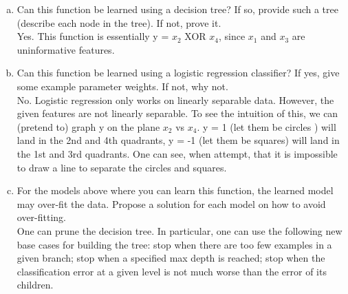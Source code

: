 \documentclass[11pt]{article}
\begin{document}
\begin{enumerate}[(a)]
\item Can this function be learned using a decision tree? If so, provide such a tree (describe each node in the tree). If not, prove it.\\

Yes. This function is essentially y = $x_2$ XOR $x_4$, since $x_1$ and $x_3$ are uninformative features.\\

\begin{center}
\end{center}

\item Can this function be learned using a logistic regression classifier? If yes, give some example parameter weights. If not, why not.\\

No. Logistic regression only works on linearly separable data. However, the given features are not linearly separable. To see the intuition of this, we can (pretend to) graph y on the plane $x_2$ vs $x_4$. y = 1 (let them be circles ) will land in the 2nd and 4th quadrants, y = -1 (let them be squares) will land in the 1st and 3rd quadrants. One can see, when attempt, that it is impossible to draw a line to separate the circles and squares. 

\item For the models above where you can learn this function, the learned model may over-fit the data. Propose a solution for each model on how to avoid over-fitting.\\

One can prune the decision tree. In particular, one can use the following new base cases for building the tree: stop when there are too few examples in a given branch; stop when a specified max depth is reached; stop when the classification error at a given level is not much worse than the error of its children. 

\end{enumerate}
\end{document}
